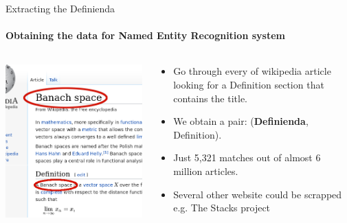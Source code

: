 \documentclass{beamer}
\begin{document}
\begin{frame}{Extracting the Definienda}
    \framesubtitle{Obtaining the data for Named Entity Recognition system}
    \begin{columns}[T]
        \begin{column}{0.5\textwidth}
    \includegraphics[width=\textwidth]{wiki_thin_banach.png}
        \end{column}
        \begin{column}{0.5\textwidth}
            \begin{itemize}
            \item Go through every of wikipedia article looking for a Definition section that contains the title.
            \item We obtain a pair: (\textbf{Definienda},  Definition).
            \item Just 5,321 matches out of almost 6 million articles.
            \item Several other website could be scrapped e.g. The Stacks project
            \end{itemize}
        \end{column}
    \end{columns}
\end{frame}
\end{document}
